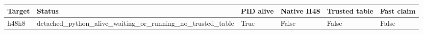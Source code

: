 {\small
\begin{tabular}{llllll}
\hline
Target & Status & PID alive & Native H48 & Trusted table & Fast claim \\
\hline
h48h8 & detached\_python\_alive\_waiting\_or\_running\_no\_trusted\_table & True & False & False & False \\
\hline
\end{tabular}
}
